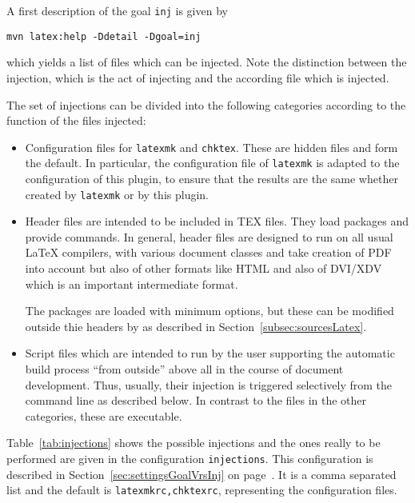A first description of the goal \texttt{inj} is given by 
%
\begin{verbatim}
mvn latex:help -Ddetail -Dgoal=inj
\end{verbatim}
%
which yields a list of files which can be injected. 
Note the distinction between the injection, which is the act of injecting 
and the according file which is injected. 

The set of injections can be divided into the following categories 
according to the function of the files injected: 
%
\begin{itemize}
  \item
  Configuration files for \texttt{latexmk} and \texttt{chktex}. 
  These are hidden files and form the default. 
  In particular, the configuration file of \texttt{latexmk} 
  is adapted to the configuration of this plugin, 
  to ensure that the results are the same whether created by \texttt{latexmk} 
  or by this plugin. 
  \item
  Header files are intended to be included in TEX files. 
  They load packages and provide commands. 
  In general, header files are designed to run on all usual \LaTeX{} compilers, 
  with various document classes  
  and take creation of PDF into account but also of other formats like HTML 
  and also of DVI/XDV which is an important intermediate format. 

  The packages are loaded with minimum options, 
  but these can be modified outside thie headers by  
  as described in Section~\ref{subsec:sourcesLatex}. 
  \item
  Script files which are intended to run by the user 
  supporting the automatic build process ``from outside''
  above all in the course of document development. 
  Thus, usually, their injection is triggered selectively from the command line 
  as described below. 
  In contrast to the files in the other categories, these are executable. 
\end{itemize}

Table~\ref{tab:injections} shows the possible injections 
and the ones really to be performed are given in the configuration \texttt{injections}. 
This configuration is described in Section~\ref{sec:settingsGoalVrsInj} 
on page~\pageref{sec:settingsGoalVrsInj}. 
It is a comma separated list and the default is \texttt{latexmkrc,chktexrc}, 
representing the configuration files. 


